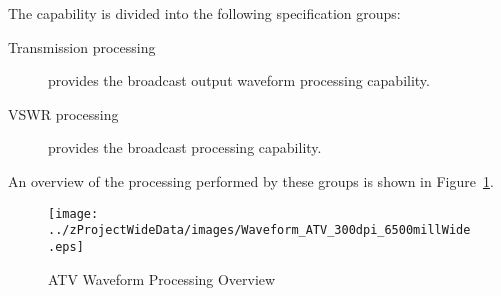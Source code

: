 The \ThisSys \ThisSegment \ATV capability is divided into the following specification groups:
\begin{description}
	\item[Transmission processing] provides the \ATV broadcast output waveform processing capability.
	\item[VSWR processing] provides the \ATV broadcast \VSWR processing capability.
\end{description}
An overview of the processing performed by these groups is shown in Figure~\ref{fig:ATV_Waveform_Processing}.
\begin{figure}[htbp]
	\centering
		\texttt{[image: ../zProjectWideData/images/Waveform\_ATV\_300dpi\_6500millWide.eps]}
	\caption[ATV Waveform Processing Overview]{ATV Waveform Processing Overview}
	\label{fig:ATV_Waveform_Processing}
\end{figure}

%
%
%

